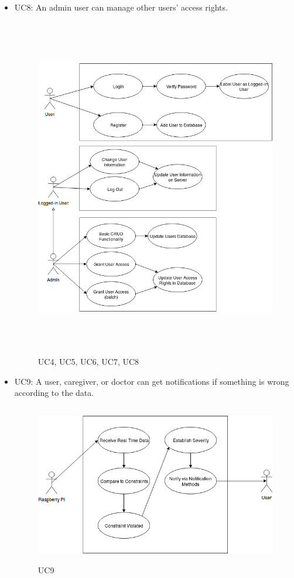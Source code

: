 \begin{itemize}
	\item UC8: An admin user can manage other users' access rights.
\begin{center}
\begin{figure}[!htb]
	\includegraphics[width=15cm, height=15cm]{Diagrams/UseCase45678.png}
	\caption{UC4, UC5, UC6, UC7, UC8}
\end{figure}
\end{center}

	\item UC9: A user, caregiver, or doctor can get notifications if something is wrong according to the data.
\begin{center}
\begin{figure}[!htb]
	\includegraphics[width=15cm, height=7cm]{Diagrams/UseCase4.png}
	\caption{UC9}
\end{figure}
\end{center}
	

\end{itemize}
